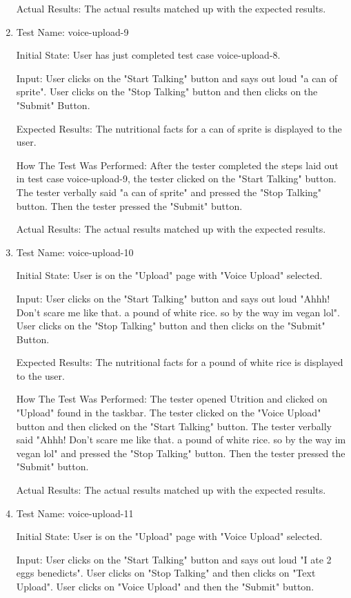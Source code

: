 \documentclass[12pt, titlepage]{article}
\begin{document}
\begin{enumerate}
		Actual Results: The actual results matched up with the expected results.
		
		\item{Test Name: voice-upload-9}
		
		Initial State: User has just completed test case voice-upload-8.
		
		Input: User clicks on the "Start Talking" button and says out loud "a can of sprite". User clicks on the "Stop Talking" button and then clicks on the "Submit" Button.
		
		Expected Results: The nutritional facts for a can of sprite is displayed to the user.
		
		How The Test Was Performed: After the tester completed the steps laid out in test case voice-upload-9, the tester clicked on the "Start Talking" button. The tester verbally said "a can of sprite" and pressed the "Stop Talking" button. Then the tester pressed the "Submit" button.
		
		Actual Results: The actual results matched up with the expected results.
		
		\item{Test Name: voice-upload-10}
		
		Initial State: User is on the "Upload" page with "Voice Upload" selected.
		
		Input: User clicks on the "Start Talking" button and says out loud "Ahhh! Don't scare me like that. a pound of white rice. so by the way im vegan lol". User clicks on the "Stop Talking" button and then clicks on the "Submit" Button.
		
		Expected Results: The nutritional facts for a pound of white rice is displayed to the user.
		
		How The Test Was Performed: The tester opened Utrition and clicked on "Upload" found in the taskbar. The tester clicked on the "Voice Upload" button and then clicked on the "Start Talking" button. The tester verbally said "Ahhh! Don't scare me like that. a pound of white rice. so by the way im vegan lol" and pressed the "Stop Talking" button. Then the tester pressed the "Submit" button.
		
		Actual Results: The actual results matched up with the expected results.
	
		\item{Test Name: voice-upload-11}
		
		Initial State: User is on the "Upload" page with "Voice Upload" selected.
		
		Input: User clicks on the "Start Talking" button and says out loud "I ate 2 eggs benedicts". User clicks on "Stop Talking" and then clicks on "Text Upload". User clicks on "Voice Upload" and then the "Submit" button.
		

\end{enumerate}
\end{document}

